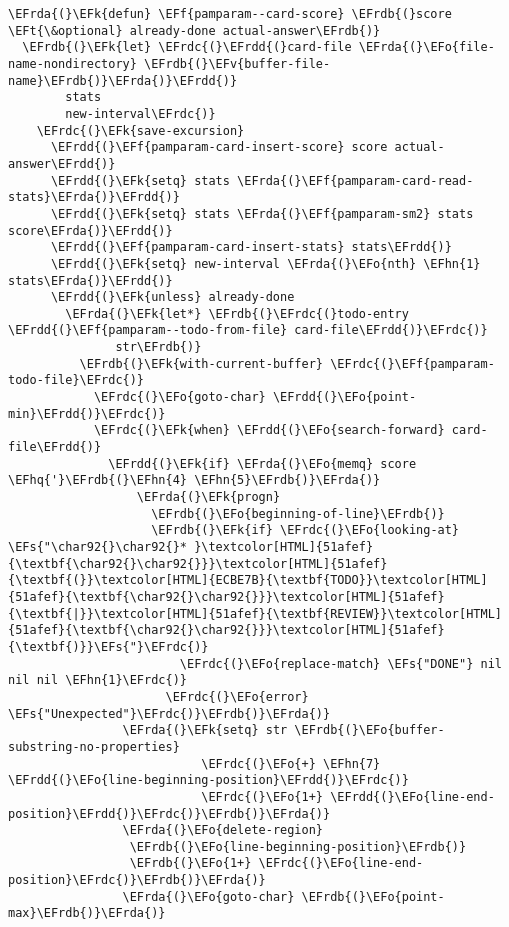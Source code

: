 \documentclass[a4wide,10pt]{article}
\newcommand{\EFs}[1]{\textcolor{EFs}{#1}} %
\newcommand{\EFk}[1]{\textcolor{EFk}{#1}} %
\newcommand{\EFf}[1]{\textcolor{EFf}{#1}} %
\newcommand{\EFv}[1]{\textcolor{EFv}{#1}} %
\newcommand{\EFt}[1]{\textcolor{EFt}{#1}} %
\newcommand{\EFo}[1]{\textcolor{EFo}{#1}} %
\newcommand{\EFhn}[1]{\textcolor{EFhn}{\textbf{#1}}} %
\newcommand{\EFhq}[1]{\textcolor{EFhq}{#1}} %
\newcommand{\EFrda}[1]{\textcolor{EFrda}{#1}} %
\newcommand{\EFrdb}[1]{\textcolor{EFrdb}{#1}} %
\newcommand{\EFrdc}[1]{\textcolor{EFrdc}{#1}} %
\newcommand{\EFrdd}[1]{\textcolor{EFrdd}{#1}} %
\begin{document}
\begin{Code}
\begin{Verbatim}
\EFrda{(}\EFk{defun} \EFf{pamparam--card-score} \EFrdb{(}score \EFt{\&optional} already-done actual-answer\EFrdb{)}
  \EFrdb{(}\EFk{let} \EFrdc{(}\EFrdd{(}card-file \EFrda{(}\EFo{file-name-nondirectory} \EFrdb{(}\EFv{buffer-file-name}\EFrdb{)}\EFrda{)}\EFrdd{)}
        stats
        new-interval\EFrdc{)}
    \EFrdc{(}\EFk{save-excursion}
      \EFrdd{(}\EFf{pamparam-card-insert-score} score actual-answer\EFrdd{)}
      \EFrdd{(}\EFk{setq} stats \EFrda{(}\EFf{pamparam-card-read-stats}\EFrda{)}\EFrdd{)}
      \EFrdd{(}\EFk{setq} stats \EFrda{(}\EFf{pamparam-sm2} stats score\EFrda{)}\EFrdd{)}
      \EFrdd{(}\EFf{pamparam-card-insert-stats} stats\EFrdd{)}
      \EFrdd{(}\EFk{setq} new-interval \EFrda{(}\EFo{nth} \EFhn{1} stats\EFrda{)}\EFrdd{)}
      \EFrdd{(}\EFk{unless} already-done
        \EFrda{(}\EFk{let*} \EFrdb{(}\EFrdc{(}todo-entry \EFrdd{(}\EFf{pamparam--todo-from-file} card-file\EFrdd{)}\EFrdc{)}
               str\EFrdb{)}
          \EFrdb{(}\EFk{with-current-buffer} \EFrdc{(}\EFf{pamparam-todo-file}\EFrdc{)}
            \EFrdc{(}\EFo{goto-char} \EFrdd{(}\EFo{point-min}\EFrdd{)}\EFrdc{)}
            \EFrdc{(}\EFk{when} \EFrdd{(}\EFo{search-forward} card-file\EFrdd{)}
              \EFrdd{(}\EFk{if} \EFrda{(}\EFo{memq} score \EFhq{'}\EFrdb{(}\EFhn{4} \EFhn{5}\EFrdb{)}\EFrda{)}
                  \EFrda{(}\EFk{progn}
                    \EFrdb{(}\EFo{beginning-of-line}\EFrdb{)}
                    \EFrdb{(}\EFk{if} \EFrdc{(}\EFo{looking-at} \EFs{"\char92{}\char92{}* }\textcolor[HTML]{51afef}{\textbf{\char92{}\char92{}}}\textcolor[HTML]{51afef}{\textbf{(}}\textcolor[HTML]{ECBE7B}{\textbf{TODO}}\textcolor[HTML]{51afef}{\textbf{\char92{}\char92{}}}\textcolor[HTML]{51afef}{\textbf{|}}\textcolor[HTML]{51afef}{\textbf{REVIEW}}\textcolor[HTML]{51afef}{\textbf{\char92{}\char92{}}}\textcolor[HTML]{51afef}{\textbf{)}}\EFs{"}\EFrdc{)}
                        \EFrdc{(}\EFo{replace-match} \EFs{"DONE"} nil nil nil \EFhn{1}\EFrdc{)}
                      \EFrdc{(}\EFo{error} \EFs{"Unexpected"}\EFrdc{)}\EFrdb{)}\EFrda{)}
                \EFrda{(}\EFk{setq} str \EFrdb{(}\EFo{buffer-substring-no-properties}
                           \EFrdc{(}\EFo{+} \EFhn{7} \EFrdd{(}\EFo{line-beginning-position}\EFrdd{)}\EFrdc{)}
                           \EFrdc{(}\EFo{1+} \EFrdd{(}\EFo{line-end-position}\EFrdd{)}\EFrdc{)}\EFrdb{)}\EFrda{)}
                \EFrda{(}\EFo{delete-region}
                 \EFrdb{(}\EFo{line-beginning-position}\EFrdb{)}
                 \EFrdb{(}\EFo{1+} \EFrdc{(}\EFo{line-end-position}\EFrdc{)}\EFrdb{)}\EFrda{)}
                \EFrda{(}\EFo{goto-char} \EFrdb{(}\EFo{point-max}\EFrdb{)}\EFrda{)}

\end{Verbatim}
\end{Code}
\end{document}
